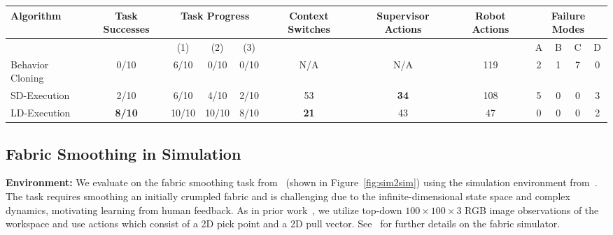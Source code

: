\begin{table*}[ht]
\centering
{
 \begin{tabular}{|l | c | c | c | c | c | c | c | c | c | c | c |} 
 \hline
 Algorithm & Task Successes & \multicolumn{3}{c|}{Task Progress} & Context Switches & Supervisor Actions & Robot Actions & \multicolumn{4}{c|}{Failure Modes} \\ 
 \hline
\multicolumn{2}{|c|}{} & (1) & (2) & (3) & \multicolumn{3}{c|}{} & A & B & C & D \\
 \hline
 Behavior Cloning & 0/10 & 6/10 & 0/10 & 0/10 & N/A & N/A & 119 & 2 & 1 & 7 & 0 \\
 \hline
 SD-Execution & 2/10 & 6/10 & 4/10 & 2/10 & 53 & \textbf{34} & 108 & 5 & 0 & 0 & 3 \\
 \hline
 LD-Execution & \textbf{8/10} & 10/10 & 10/10 & 8/10 & \textbf{21} & 43 & 47 & 0 & 0 & 0 & 2 \\
\hline
\end{tabular}}
\caption{\textbf{Physical Fabric Manipulation Experiments:} We evaluate \algname-Execution and baselines on a physical 3-stage fabric manipulation task and report the success rate and supervisor burden in terms of total supervisor actions and bidirectional context switches (summed across all 10 trials). Task Progress indicates how many trials completed each of the 3 stages: Smoothing, Aligning, and Folding. \algname-Execution achieves more successes with fewer context switches ($L^* = 0.28$). We observe the following failure modes (Table~\ref{tab:phys_results}): (A) action limit hit ($>$ 15 total actions), (B) fabric is more than 50\% out of bounds, (C) incorrect predicted pick point, and (D) the policy failed to request an intervention despite high ground truth action discrepancy.}
\label{tab:phys_results}
\end{table*}

\subsection{Fabric Smoothing in Simulation} \label{ssec:fabric_sim_results}
\textbf{Environment: }
We evaluate \algabbr on the fabric smoothing task from~\cite{seita_fabrics_2020} (shown in Figure~\ref{fig:sim2sim}) using the simulation environment from~\cite{seita_fabrics_2020}. The task requires smoothing an initially crumpled fabric and is challenging due to the infinite-dimensional state space and complex dynamics, motivating learning from human feedback. As in prior work~\cite{seita_fabrics_2020}, we utilize top-down $100 \times 100 \times 3$ RGB image observations of the workspace and use actions which consist of a 2D pick point and a 2D pull vector. See~\cite{seita_fabrics_2020} for further details on the fabric simulator.

